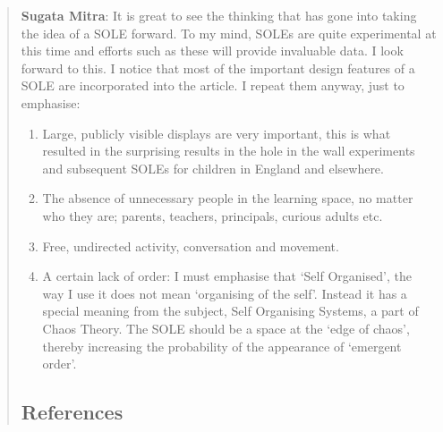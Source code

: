 \begin{quote}
\textbf{Sugata Mitra}: It is great to see the thinking that has gone
into taking the idea of a SOLE forward. To my mind, SOLEs are quite
experimental at this time and efforts such as these will provide
invaluable data. I look forward to this. I notice that most of the
important design features of a SOLE are incorporated into the article. I
repeat them anyway, just to emphasise:

\begin{enumerate}
\def\labelenumi{\arabic{enumi}.}
\item
  Large, publicly visible displays are very important, this is what
  resulted in the surprising results in the hole in the wall experiments
  and subsequent SOLEs for children in England and elsewhere.
\item
  The absence of unnecessary people in the learning space, no matter who
  they are; parents, teachers, principals, curious adults etc.
\item
  Free, undirected activity, conversation and movement.
\item
  A certain lack of order: I must emphasise that `Self Organised', the
  way I use it does not mean `organising of the self'. Instead it has a
  special meaning from the subject, Self Organising Systems, a part of
  Chaos Theory. The SOLE should be a space at the `edge of chaos',
  thereby increasing the probability of the appearance of `emergent
  order'.
\end{enumerate}

\subsection{References}\label{references}
\end{quote}

